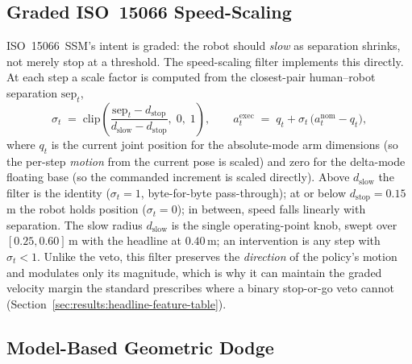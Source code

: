 \documentclass[11pt,a4paper]{report}
\newcommand{\ssm}{SSM}
\newcommand{\iso}{ISO~15066}
\begin{document}
\subsection{Graded \iso{} Speed-Scaling}
\label{sec:method:filter:speedscale}

\iso{}~\ssm{}'s intent is graded: the robot should \emph{slow} as
separation shrinks, not merely stop at a threshold. The speed-scaling
filter implements this directly. At each step a scale factor is
computed from the closest-pair human--robot separation
$\mathrm{sep}_t$,
\begin{equation}
  \sigma_t \;=\; \mathrm{clip}\!\left(
    \frac{\mathrm{sep}_t - d_{\mathrm{stop}}}
         {d_{\mathrm{slow}} - d_{\mathrm{stop}}},\; 0,\; 1\right),
  \qquad
  a^{\mathrm{exec}}_t \;=\; q_t + \sigma_t \,
    \bigl(a^{\mathrm{nom}}_t - q_t\bigr),
  \label{eq:speed-scale}
\end{equation}
where $q_t$ is the current joint position for the absolute-mode arm
dimensions (so the per-step \emph{motion} from the current pose is
scaled) and zero for the delta-mode floating base (so the commanded
increment is scaled directly). Above $d_{\mathrm{slow}}$ the filter
is the identity ($\sigma_t = 1$, byte-for-byte pass-through); at or
below $d_{\mathrm{stop}} = 0.15$\,m the robot holds position
($\sigma_t = 0$); in between, speed falls linearly with separation.
The slow radius $d_{\mathrm{slow}}$ is the single operating-point
knob, swept over $[0.25, 0.60]$\,m with the headline at $0.40$\,m;
an intervention is any step with $\sigma_t < 1$. Unlike the veto,
this filter preserves the \emph{direction} of the policy's motion
and modulates only its magnitude, which is why it can maintain the
graded velocity margin the standard prescribes where a binary
stop-or-go veto cannot
(Section~\ref{sec:results:headline-feature-table}).

\subsection{Model-Based Geometric Dodge}
\label{sec:method:filter:dodge}
\end{document}
